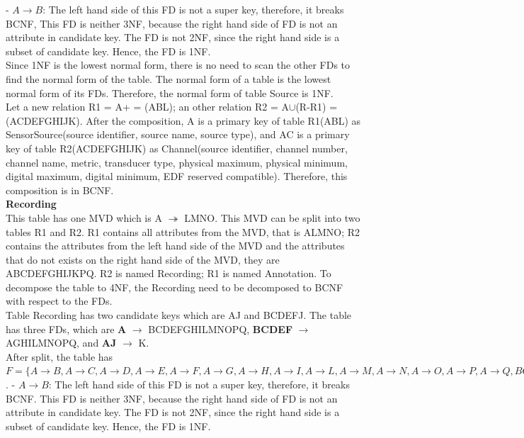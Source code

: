 - $A \rightarrow B$: The left hand side of this FD is not a super key, therefore, it breaks BCNF, This FD is neither 3NF, because the right hand side of FD is not an attribute in candidate key. The FD is not 2NF, since the right hand side is a subset of candidate key. Hence, the FD is 1NF.\\
Since 1NF is the lowest normal form, there is no need to scan the other FDs to find the normal form of the table. The normal form of a table is the lowest normal form of its FDs. Therefore, the normal form of table Source is 1NF.\\
Let a new relation R1 = A+ = (ABL); an other relation R2 = A$\cup$(R-R1) = (ACDEFGHIJK). After the composition, A is a primary key of table R1(ABL) as SensorSource(source identifier, source name, source type), and AC is a primary key of table R2(ACDEFGHIJK) as Channel(source identifier, channel number, channel name, metric, transducer type, physical maximum, physical minimum, digital maximum, digital minimum, EDF reserved compatible). Therefore, this composition is in BCNF.\\
\textbf{Recording}\\
This table has one MVD which is A $\twoheadrightarrow$ LMNO. This MVD can be split into two tables R1 and R2. R1 contains all attributes from the MVD, that is ALMNO; R2 contains the attributes from the left hand side of the MVD and the attributes that do not exists on the right hand side of the MVD, they are ABCDEFGHIJKPQ. R2 is named Recording; R1 is named Annotation. To decompose the table to 4NF, the Recording need to be decomposed to BCNF with respect to the FDs.\\
Table Recording has two candidate keys which are AJ and BCDEFJ. The table has three FDs, which are \textbf{A} $\rightarrow$ BCDEFGHILMNOPQ, \textbf{BCDEF} $\rightarrow$ AGHILMNOPQ, and \textbf{AJ} $\rightarrow$ K.\\
After split, the table has $F=\{A \rightarrow B, A \rightarrow C, A \rightarrow D, A \rightarrow E, A \rightarrow F, A \rightarrow G, A \rightarrow H, A \rightarrow I, A \rightarrow L, A \rightarrow M, A \rightarrow N, A \rightarrow O, A \rightarrow P, A \rightarrow Q, BCDEF \rightarrow A, BCDEF \rightarrow G, BCDEF \rightarrow H, BCDEF \rightarrow I, BCDEF \rightarrow L, BCDEF \rightarrow M, BCDEF \rightarrow N, BCDEF \rightarrow O, BCDEF \rightarrow P, BCDEF \rightarrow Q, AJ \rightarrow K\}$.
- $A \rightarrow B$: The left hand side of this FD is not a super key, therefore, it breaks BCNF. This FD is neither 3NF, because the right hand side of FD is not an attribute in candidate key. The FD is not 2NF, since the right hand side is a subset of candidate key. Hence, the FD is 1NF.\\
